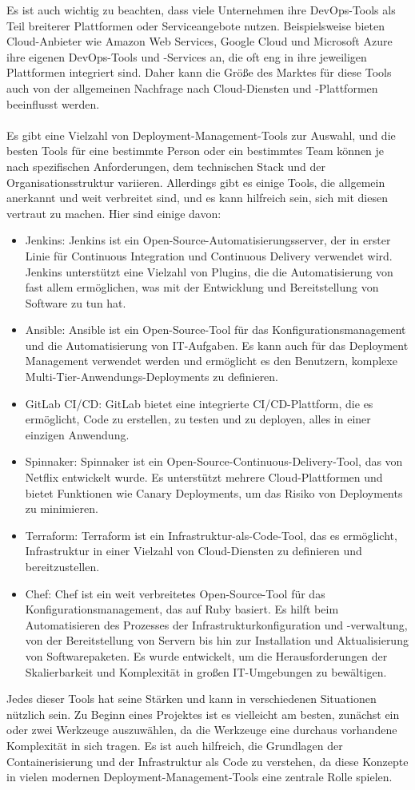 Es ist auch wichtig zu beachten, dass viele Unternehmen ihre DevOps-Tools als Teil breiterer Plattformen oder Serviceangebote nutzen. Beispielsweise bieten Cloud-Anbieter wie Amazon Web Services, Google Cloud und Microsoft Azure ihre eigenen DevOps-Tools und -Services an, die oft eng in ihre jeweiligen Plattformen integriert sind. Daher kann die Größe des Marktes für diese Tools auch von der allgemeinen Nachfrage nach Cloud-Diensten und -Plattformen beeinflusst werden.
\\\\
Es gibt eine Vielzahl von Deployment-Management-Tools zur Auswahl, und die besten Tools für eine bestimmte Person oder ein bestimmtes Team können je nach spezifischen Anforderungen, dem technischen Stack und der Organisationsstruktur variieren. Allerdings gibt es einige Tools, die allgemein anerkannt und weit verbreitet sind, und es kann hilfreich sein, sich mit diesen vertraut zu machen. Hier sind einige davon:
\begin{itemize} 
\item Jenkins: Jenkins ist ein Open-Source-Automatisierungsserver, der in erster Linie für Continuous Integration und Continuous Delivery verwendet wird. Jenkins unterstützt eine Vielzahl von Plugins, die die Automatisierung von fast allem ermöglichen, was mit der Entwicklung und Bereitstellung von Software zu tun hat.
\item Ansible: Ansible ist ein Open-Source-Tool für das Konfigurationsmanagement und die Automatisierung von IT-Aufgaben. Es kann auch für das Deployment Management verwendet werden und ermöglicht es den Benutzern, komplexe Multi-Tier-Anwendungs-Deployments zu definieren.
\item GitLab CI/CD: GitLab bietet eine integrierte CI/CD-Plattform, die es ermöglicht, Code zu erstellen, zu testen und zu deployen, alles in einer einzigen Anwendung.
\item Spinnaker: Spinnaker ist ein Open-Source-Continuous-Delivery-Tool, das von Netflix entwickelt wurde. Es unterstützt mehrere Cloud-Plattformen und bietet Funktionen wie Canary Deployments, um das Risiko von Deployments zu minimieren.
\item Terraform: Terraform ist ein Infrastruktur-als-Code-Tool, das es ermöglicht, Infrastruktur in einer Vielzahl von Cloud-Diensten zu definieren und bereitzustellen.
\item Chef: Chef ist ein weit verbreitetes Open-Source-Tool für das Konfigurationsmanagement, das auf Ruby basiert. Es hilft beim Automatisieren des Prozesses der Infrastrukturkonfiguration und -verwaltung, von der Bereitstellung von Servern bis hin zur Installation und Aktualisierung von Softwarepaketen. Es wurde entwickelt, um die Herausforderungen der Skalierbarkeit und Komplexität in großen IT-Umgebungen zu bewältigen.
\end{itemize} 
Jedes dieser Tools hat seine Stärken und kann in verschiedenen Situationen nützlich sein. Zu Beginn eines Projektes ist es vielleicht am besten, zunächst ein oder zwei Werkzeuge auszuwählen, da die Werkzeuge eine durchaus vorhandene Komplexität in sich tragen. Es ist auch hilfreich, die Grundlagen der Containerisierung und der Infrastruktur als Code zu verstehen, da diese Konzepte in vielen modernen Deployment-Management-Tools eine zentrale Rolle spielen.
